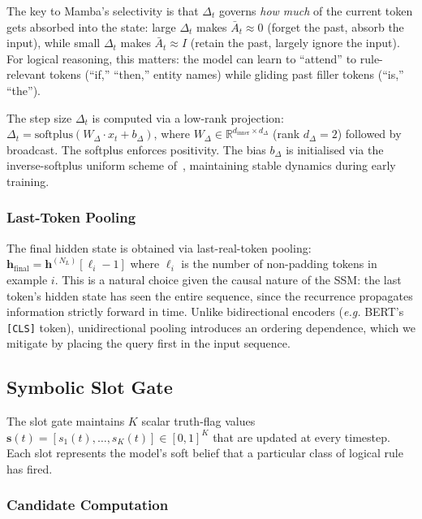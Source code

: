 \documentclass[conference]{IEEEtran}
\newcommand{\Real}{\mathbb{R}}
\newcommand{\eg}{\textit{e.g.}}
\begin{document}
The key to Mamba's selectivity is that $\Delta_t$ governs
\emph{how much} of the current token gets absorbed into the state:
large $\Delta_t$ makes $\bar{A}_t \approx 0$ (forget the past,
absorb the input), while small $\Delta_t$ makes $\bar{A}_t
\approx I$ (retain the past, largely ignore the input). For
logical reasoning, this matters: the model can learn to
``attend'' to rule-relevant tokens (``if,'' ``then,'' entity
names) while gliding past filler tokens (``is,'' ``the'').

The step size $\Delta_t$ is computed via a low-rank projection:
$\Delta_t = \mathrm{softplus}(W_{\Delta} \cdot x_t + b_\Delta)$,
where $W_\Delta \in \Real^{d_{\text{inner}} \times d_\Delta}$
(rank $d_\Delta = 2$) followed by broadcast. The softplus
enforces positivity. The bias $b_\Delta$ is initialised via the
inverse-softplus uniform scheme of~\cite{gu2023mamba}, maintaining
stable dynamics during early training.

\subsubsection{Last-Token Pooling}

The final hidden state is obtained via last-real-token pooling:
$\mathbf{h}_{\text{final}} = \mathbf{h}^{(N_L)}[\ell_i - 1]$
where $\ell_i$ is the number of non-padding tokens in example $i$.
This is a natural choice given the causal nature of the SSM: the
last token's hidden state has seen the entire sequence, since the
recurrence propagates information strictly forward in time. Unlike
bidirectional encoders (\eg{} BERT's \texttt{[CLS]} token),
unidirectional pooling introduces an ordering dependence, which
we mitigate by placing the query first in the input sequence.

\subsection{Symbolic Slot Gate}
\label{sec:slotgate}

The slot gate maintains $K$ scalar truth-flag values
$\mathbf{s}(t) = [s_1(t), \dots, s_K(t)] \in [0,1]^K$ that are
updated at every timestep. Each slot represents the model's
soft belief that a particular class of logical rule has fired.

\subsubsection{Candidate Computation}
\end{document}
